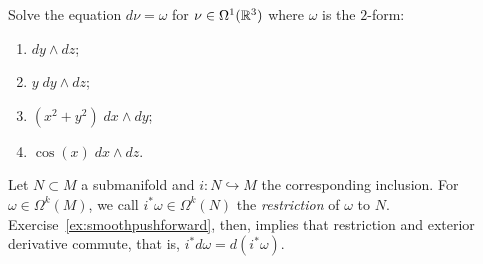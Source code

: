 \begin{exercise}
	Solve the equation $d \nu = \omega$ for $\nu \in \Omega^1(\mathbb{R}^3)$ where $\omega$ is the $2$-form:
	\begin{enumerate}
		\item $d y \wedge d z$;
		\item $y\; d y \wedge d z$;
		\item $(x^2 + y^2) \; d x \wedge d y$;
		\item $\cos(x)\; d x \wedge d z$.
	\end{enumerate}
\end{exercise}

Let $N\subset M$ a submanifold and $i:N\hookrightarrow M$ the corresponding inclusion.
For $\omega\in\Omega^k(M)$, we call $i^*\omega \in \Omega^k(N)$ the \emph{restriction} of $\omega$ to $N$.
Exercise~\ref{ex:smoothpushforward}, then, implies that restriction and exterior derivative commute, that is, $i^*d\omega = d(i^*\omega)$.

